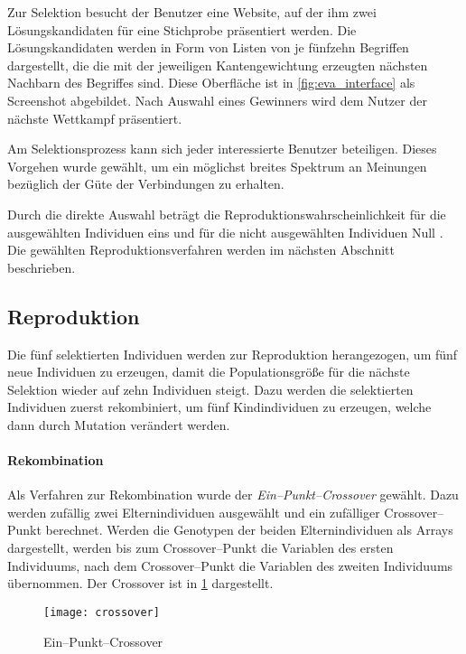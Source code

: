 Zur Selektion besucht der Benutzer eine Website, auf der ihm zwei Lösungskandidaten für eine Stichprobe präsentiert werden. Die Lösungskandidaten werden in Form von Listen von je fünfzehn Begriffen dargestellt, die die mit der jeweiligen Kantengewichtung erzeugten nächsten Nachbarn des Begriffes sind. Diese Oberfläche ist in \cref{fig:eva_interface} als Screenshot abgebildet. Nach Auswahl eines Gewinners wird dem Nutzer der nächste Wettkampf präsentiert.

Am Selektionsprozess kann sich jeder interessierte Benutzer beteiligen. Dieses Vorgehen wurde gewählt, um ein möglichst breites Spektrum an Meinungen bezüglich der Güte der Verbindungen zu erhalten.

Durch die direkte Auswahl beträgt die Reproduktionswahrscheinlichkeit für die ausgewählten Individuen eins und für die nicht ausgewählten Individuen Null \cite{sd2012}. Die gewählten Reproduktionsverfahren werden im nächsten Abschnitt beschrieben.

\subsection{Reproduktion}

Die fünf selektierten Individuen werden zur Reproduktion herangezogen, um fünf neue Individuen zu erzeugen, damit die Populationsgröße für die nächste Selektion wieder auf zehn Individuen steigt. Dazu werden die selektierten Individuen zuerst rekombiniert, um fünf Kindindividuen zu erzeugen, welche dann durch Mutation verändert werden.

\paragraph{Rekombination}

Als Verfahren zur Rekombination wurde der \emph{Ein--Punkt--Crossover} \cite{kw2007} gewählt. Dazu werden zufällig zwei Elternindividuen ausgewählt und ein zufälliger Crossover--Punkt berechnet. Werden die Genotypen der beiden Elternindividuen als Arrays dargestellt, werden bis zum Crossover--Punkt die Variablen des ersten Individuums, nach dem Crossover--Punkt die Variablen des zweiten Individuums übernommen. Der Crossover ist in \cref{fig:crossover} dargestellt.

\begin{figure}
\centering
\texttt{[image: crossover]}
\caption{Ein--Punkt--Crossover}
\label{fig:crossover}
\end{figure}

